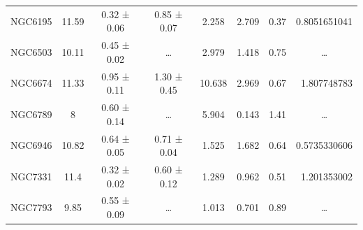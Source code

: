\documentclass[reprint,%
 amsmath,amssymb,
 aps,
]{revtex4-1}
\begin{document}
\begin{table}[]
\begin{tabular}{cccccrrc}
\rowcolor[HTML]{F3F3F3} 
NGC6195              & 11.59                     & 0.32 ± 0.06           & 0.85 ± 0.07            & 2.258                                                        & 2.709                                                           & 0.37                                                          & \multicolumn{1}{r}{\cellcolor[HTML]{F3F3F3}0.8051651041}      \\
\rowcolor[HTML]{F3F3F3} 
NGC6503              & 10.11                     & 0.45 ± 0.02           & …                      & 2.979                                                        & 1.418                                                         & 0.75                                                           & …                                                             \\
\rowcolor[HTML]{F3F3F3} 
NGC6674              & 11.33                     & 0.95 ± 0.11           & 1.30 ± 0.45            & 10.638                                                       & 2.969                                                         & 0.67                                                          & \multicolumn{1}{r}{\cellcolor[HTML]{F3F3F3}1.807748783}       \\
\rowcolor[HTML]{F3F3F3} 
NGC6789              & 8                         & 0.60 ± 0.14           & …                      & 5.904                                                        & 0.143                                                        & 1.41                                                         & …                                                             \\
\rowcolor[HTML]{F3F3F3} 
NGC6946              & 10.82                     & 0.64 ± 0.05           & 0.71 ± 0.04            & 1.525                                                        & 1.682                                                          & 0.64                                                           & \multicolumn{1}{r}{\cellcolor[HTML]{F3F3F3}0.5735330606}      \\
\rowcolor[HTML]{F3F3F3} 
NGC7331              & 11.4                      & 0.32 ± 0.02           & 0.60 ± 0.12            & 1.289                                                        & 0.962                                                          & 0.51                                                          & \multicolumn{1}{r}{\cellcolor[HTML]{F3F3F3}1.201353002}       \\
\rowcolor[HTML]{F3F3F3} 
NGC7793              & 9.85                      & 0.55 ± 0.09           & …                      & 1.013                                                        & 0.701                                                         & 0.89                                                          & …                                                             \\

\end{tabular}
\end{table}
\end{document}
